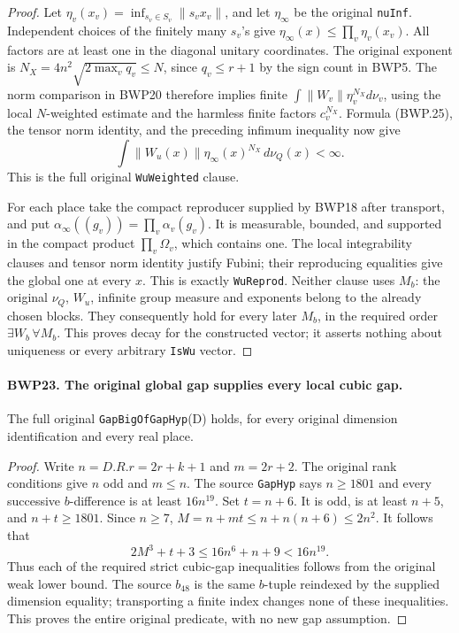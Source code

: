 \documentclass[11pt,a4paper]{article}
\numberwithin{equation}{section}
\theoremstyle{remark}\newtheorem{remark}[theorem]{Remark}
\begin{document}
\begin{proof}
Let \(\eta_v(x_v)=\inf_{s_v\in S_v}\|s_vx_v\|\), and
let \(\eta_\infty\) be the original \texttt{nu\allowbreak Inf}.
Independent choices of the finitely many \(s_v\)'s give
\(\eta_\infty(x)\le\prod_v\eta_v(x_v)\).
All factors are at least one in the diagonal unitary coordinates.
The original exponent is
\(N_X=4n^2\sqrt{2\max_v q_v}\le N\), since
\(q_v\le r+1\) by the sign count in BWP5.
The norm comparison in BWP20 therefore implies finite
\(\int\|W_v\|\eta_v^{N_X}d\nu_v\), using the local
\(N\)-weighted estimate and the harmless finite factors
\(c_v^{N_X}\).  Formula (BWP.25), the tensor norm identity, and
the preceding infimum inequality now give
\[
 \int\|W_u(x)\|\eta_\infty(x)^{N_X}\,d\nu_Q(x)<\infty.
 \tag{BWP.27}
\]
This is the full original \texttt{Wu\allowbreak Weighted} clause.

For each place take the compact reproducer supplied by BWP18 after
transport, and put \(\alpha_\infty((g_v))=\prod_v\alpha_v(g_v)\).
It is measurable, bounded, and supported in the compact product
\(\prod_v\Omega_v\), which contains one.  The local integrability
clauses and tensor norm identity justify Fubini; their reproducing
equalities give the global one at every \(x\).  This is exactly
\texttt{Wu\allowbreak Reprod}.  Neither clause uses \(M_b\): the original
\(\nu_Q\), \(W_u\), infinite group measure and exponents belong
to the already chosen blocks.  They consequently hold for every
later \(M_b\), in the required order \(\exists W_b\,\forall M_b\).
This proves decay for the constructed vector; it asserts nothing
about uniqueness or every arbitrary \texttt{Is\allowbreak Wu} vector.
\end{proof}

\paragraph{BWP23. The original global gap supplies every local cubic gap.}
\label{claim:BWP23}
The full original \texttt{Gap\allowbreak Big\allowbreak Of\allowbreak Gap\allowbreak Hyp}(D) holds, for every
original dimension identification and every real place.

\begin{proof}
Write \(n=D.R.r=2r+k+1\) and \(m=2r+2\).  The original
rank conditions give \(n\) odd and \(m\le n\).
The source \texttt{Gap\allowbreak Hyp} says \(n\ge1801\) and every
successive \(b\)-difference is at least \(16n^{19}\).
Set \(t=n+6\).  It is odd, is at least \(n+5\), and
\(n+t\ge1801\).  Since \(n\ge7\),
\(M=n+mt\le n+n(n+6)\le2n^2\).
It follows that
\[
 2M^3+t+3\le16n^6+n+9<16n^{19}.
\]
Thus each of the required strict cubic-gap inequalities follows from
the original weak lower bound.  The source \(b_{48}\) is the
same \(b\)-tuple reindexed by the supplied dimension equality;
transporting a finite index changes none of these inequalities.
This proves the entire original predicate, with no new gap assumption.
\end{proof}
\end{document}
